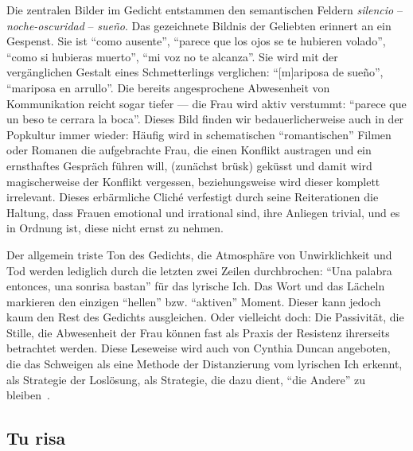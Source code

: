 Die zentralen Bilder im Gedicht entstammen den semantischen Feldern \textit{silencio} -- \textit{noche-oscuridad} -- \textit{sueño}.
Das gezeichnete Bildnis der Geliebten erinnert an ein Gespenst.
Sie ist ``como ausente'', ``parece que los ojos se te hubieren volado'', ``como si hubieras muerto'', ``mi voz no te alcanza''.
Sie wird mit der vergänglichen Gestalt eines Schmetterlings verglichen: ``[m]ariposa de sueño'', ``mariposa en arrullo''.
Die bereits angesprochene Abwesenheit von Kommunikation reicht sogar tiefer — die Frau wird aktiv verstummt: ``parece que un beso te cerrara la boca''.
Dieses Bild finden wir bedauerlicherweise auch in der Popkultur immer wieder:
Häufig wird in schematischen ``romantischen'' Filmen oder Romanen die aufgebrachte Frau, die einen Konflikt austragen und ein ernsthaftes Gespräch führen will, (zunächst brüsk) geküsst und damit wird magischerweise der Konflikt vergessen, beziehungsweise wird dieser komplett irrelevant.
Dieses erbärmliche Cliché verfestigt durch seine Reiterationen die Haltung, dass Frauen emotional und irrational sind, ihre Anliegen trivial, und es in Ordnung ist, diese nicht ernst zu nehmen.

Der allgemein triste Ton des Gedichts, die Atmosphäre von Unwirklichkeit und Tod werden lediglich durch die letzten zwei Zeilen durchbrochen: ``Una palabra entonces, una sonrisa bastan'' für das lyrische Ich.
Das Wort und das Lächeln markieren den einzigen ``hellen'' bzw. ``aktiven'' Moment.
Dieser kann jedoch kaum den Rest des Gedichts ausgleichen.
Oder vielleicht doch: Die Passivität, die Stille, die Abwesenheit der Frau können fast als Praxis der Resistenz ihrerseits betrachtet werden.
Diese Leseweise wird auch von Cynthia Duncan angeboten, die das Schweigen als eine Methode der Distanzierung vom lyrischen Ich erkennt, als Strategie der Loslösung, als Strategie, die dazu dient, ``die Andere'' zu bleiben~\cite{Duncan1992}.

\begin{comment}
  * 4 x 4Line verse: Quartette (lookup wie das korrekt heißt auf Deutsch!) + 2 x 2Zeiler (Couplets) --> erinnert ein bisschen an Sonnetform aber nicht ganz (Wie heißen nochma die verschiedene Sonnetformen? Nicht die von Gongora sondern die von Shakespeare meine ich grad: 3x4Zeilen und dann 2)
\end{comment}

\subsection{Tu risa}

